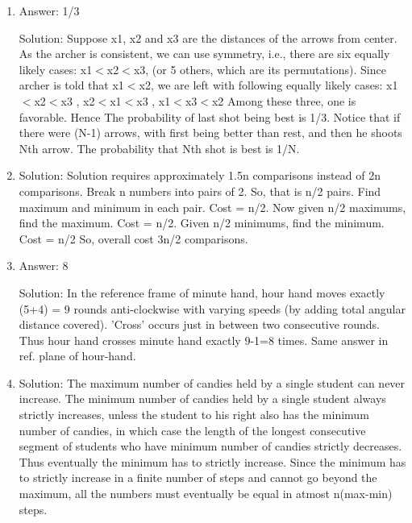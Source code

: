 \begin{enumerate}

\item
Answer: 1/3
 
Solution: Suppose x1, x2 and x3 are the distances of the arrows from center. As the archer is consistent, we can use symmetry, i.e., there are six equally likely cases: x1$<$x2$<$x3, (or 5 others, which are its permutations). Since archer is told that x1$<$x2, we are left with following equally likely cases:
x1$<$x2$<$x3 , x2$<$x1$<$x3 , x1$<$x3$<$x2
Among these three, one is favorable. Hence The probability of last shot being best is 1/3.
Notice that if there were (N-1) arrows, with first being better than rest, and then he shoots Nth arrow. The probability that Nth shot is best is 1/N.




\item
Solution: Solution requires approximately 1.5n comparisons instead of 2n comparisons.
Break n numbers into pairs of 2.
So, that is n/2 pairs. Find maximum and minimum in each pair. Cost = n/2.
Now given n/2 maximums, find the maximum. Cost = n/2. Given n/2 minimums, find the minimum. Cost = n/2
So, overall cost 3n/2 comparisons.




\item
Answer: 8
 
Solution: In the reference frame of minute hand, hour hand moves exactly (5+4) = 9 rounds anti-clockwise with varying speeds (by adding total angular distance covered). 'Cross' occurs just in between two consecutive rounds. Thus hour hand crosses minute hand exactly 9-1=8 times. Same answer in ref. plane of hour-hand.




\item
Solution: The maximum number of candies held by a single student can never increase.
The minimum number of candies held by a single student always strictly increases, unless the student to his right also has the minimum number of candies, in which case the length of the longest consecutive segment of students who have minimum number of candies strictly decreases. Thus eventually the minimum has to strictly increase.
Since the minimum has to strictly increase in a finite number of steps and cannot go beyond the maximum, all the numbers must eventually be equal in atmost n(max-min) steps.




\end{enumerate}
